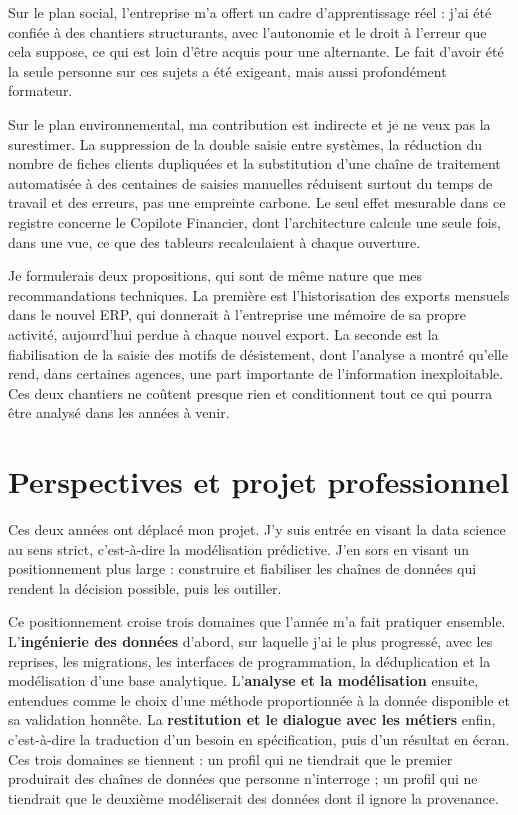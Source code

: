Sur le plan social, l'entreprise m'a offert un cadre d'apprentissage réel : j'ai été confiée à
des chantiers structurants, avec l'autonomie et le droit à l'erreur que cela suppose, ce qui est
loin d'être acquis pour une alternante. Le fait d'avoir été la seule personne sur ces sujets a
été exigeant, mais aussi profondément formateur.

Sur le plan environnemental, ma contribution est indirecte et je ne veux pas la surestimer. La
suppression de la double saisie entre systèmes, la réduction du nombre de fiches clients
dupliquées et la substitution d'une chaîne de traitement automatisée à des centaines de saisies
manuelles réduisent surtout du temps de travail et des erreurs, pas une empreinte carbone. Le
seul effet mesurable dans ce registre concerne le Copilote Financier, dont l'architecture
calcule une seule fois, dans une vue, ce que des tableurs recalculaient à chaque ouverture.

Je formulerais deux propositions, qui sont de même nature que mes recommandations techniques.
La première est l'historisation des exports mensuels dans le nouvel ERP, qui donnerait à
l'entreprise une mémoire de sa propre activité, aujourd'hui perdue à chaque nouvel export. La
seconde est la fiabilisation de la saisie des motifs de désistement, dont l'analyse a montré
qu'elle rend, dans certaines agences, une part importante de l'information inexploitable. Ces
deux chantiers ne coûtent presque rien et conditionnent tout ce qui pourra être analysé dans les
années à venir.

\section{Perspectives et projet professionnel}

Ces deux années ont déplacé mon projet. J'y suis entrée en visant la data science au sens
strict, c'est-à-dire la modélisation prédictive. J'en sors en visant un positionnement plus
large : construire et fiabiliser les chaînes de données qui rendent la décision possible, puis
les outiller.

Ce positionnement croise trois domaines que l'année m'a fait pratiquer ensemble.
L'\textbf{ingénierie des données} d'abord, sur laquelle j'ai le plus progressé, avec les
reprises, les migrations, les interfaces de programmation, la déduplication et la modélisation
d'une base analytique. L'\textbf{analyse et la modélisation} ensuite, entendues comme le choix
d'une méthode proportionnée à la donnée disponible et sa validation honnête. La
\textbf{restitution et le dialogue avec les métiers} enfin, c'est-à-dire la traduction d'un
besoin en spécification, puis d'un résultat en écran. Ces trois domaines se tiennent : un profil
qui ne tiendrait que le premier produirait des chaînes de données que personne n'interroge ; un
profil qui ne tiendrait que le deuxième modéliserait des données dont il ignore la provenance.

